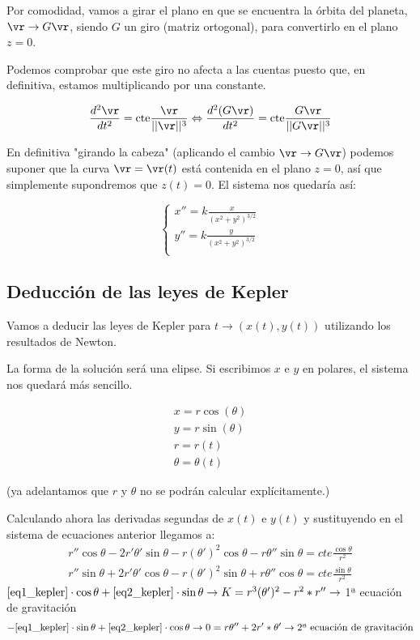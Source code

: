 Por comodidad, vamos a girar el plano en que se encuentra la órbita del planeta, $\vr \rightarrow G\vr$, siendo $G$ un giro (matriz ortogonal), para convertirlo en el plano $z=0$.

Podemos comprobar que este giro no afecta a las cuentas puesto que, en definitiva, estamos multiplicando por una constante.

$$\frac{d^2\vr}{dt^2} = \text{cte}\frac{\vr}{||\vr||^3} \Leftrightarrow \frac{d^2(G\vr)}{dt^2} = \text{cte}\frac{G\vr}{||G\vr||^3}$$

En definitiva "girando la cabeza" (aplicando el cambio $\vr \rightarrow G\vr$) podemos suponer que la curva $\vr = \vr(t)$ está contenida en el plano $z = 0$, así que simplemente supondremos que $z(t) = 0$. El sistema nos quedaría así:


$$
\begin{cases}
 x'' = k\frac{x}{(x^2 + y^2)^{3/2}}\\
 y'' = k\frac{y}{(x^2 + y^2)^{3/2}}\\
\end{cases}
$$

\subsection{Deducción de las leyes de Kepler}

Vamos a deducir las leyes de Kepler para $t \rightarrow (x(t), y(t))$ utilizando los resultados de Newton.

La forma de la solución será una elipse.
Si escribimos $x$ e $y$ en polares, el sistema nos quedará más sencillo.

$$\begin{array}{c}
x = r\cos(\theta)\\
y = r\sin(\theta) \\
r = r(t) \\
\theta = \theta(t)
\end{array}
$$

(ya adelantamos que $r$ y $\theta$ no se podrán calcular explícitamente.)

Calculando ahora las derivadas segundas de $x(t)$ e $y(t)$ y sustituyendo en el sistema de ecuaciones anterior llegamos a:
\begin{gather}
r''\cos\theta - 2r'\theta'\sin\theta - r(\theta')^2\cos\theta - r\theta''\sin\theta = cte \frac{\cos\theta}{r^2} \label{eq1_kepler}\\
r''\sin\theta + 2r'\theta'\cos\theta - r(\theta')^2\sin\theta + r\theta''\cos\theta = cte \frac{\sin\theta}{r^2} \label{eq2_kepler}
\end{gather}
$\eqref{eq1_kepler}\cdot\cos\theta + \eqref{eq2_kepler}\cdot\sin\theta \rightarrow K= r^3(\theta')^2 - r^2*r'' \rightarrow$ 1ª ecuación de gravitación
$$-\eqref{eq1_kepler}\cdot\sin\theta + \eqref{eq2_kepler}\cdot\cos\theta \rightarrow 0= r \theta'' + 2r' * \theta' \rightarrow \text{2ª ecuación de gravitación}$$


